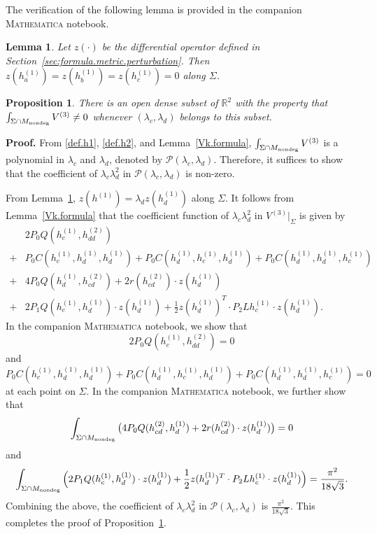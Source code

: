 \documentclass[11pt]{amsart}
\newtheorem{lemma}[theorem]{Lemma}
\newtheorem{proposition}[theorem]{Proposition}
\theoremstyle{definition}
\begin{document}
The verification of the following lemma is provided in the companion \textsc{Mathematica} notebook.

\begin{lemma}\label{za.zb.zc.vanish}
Let $z(\cdot)$ be the differential operator defined in Section~\ref{sec:formula.metric.perturbation}. 
Then $z(h^{(1)}_a)=z(h^{(1)}_b)=z(h^{(1)}_c)=0$ along $\Sigma$.
\end{lemma}


\begin{proposition}
\label{third.order.change.in.sectional.curvature.integral.version}
There is an open dense subset of $\mathbb{R}^2$ with the property that $\int_{\Sigma \cap M_{\text{\rm nondeg}}} V^{(3)} \neq 0$ whenever $(\lambda_c,\lambda_d)$ belongs to this subset. 
\end{proposition}

\textbf{Proof.} 
From \eqref{def.h1}, \eqref{def.h2}, and Lemma~\ref{Vk.formula}, $\int_{\Sigma \cap M_{\text{\rm nondeg}}} V^{(3)}$ is a polynomial in $\lambda_c$ and $\lambda_d$, denoted by $\mathcal{P}(\lambda_c,\lambda_d)$.
Therefore, it suffices to show that the coefficient of $\lambda_c\lambda_d^2$ in $\mathcal{P}(\lambda_c,\lambda_d)$ is non-zero. 

From Lemma~\ref{za.zb.zc.vanish}, $z(h^{(1)})=\lambda_d z(h^{(1)}_d)$ along $\Sigma$.
It follows from Lemma~\ref{Vk.formula} that the coefficient function of $\lambda_c\lambda_d^2$ in $V^{(3)}|_{\Sigma}$ is given by
\begin{align*}
&2 P_0Q(h^{(1)}_c,h^{(2)}_{dd}) \\
+&P_0C( h^{(1)}_c, h^{(1)}_d, h^{(1)}_d )+P_0C( h^{(1)}_d, h^{(1)}_c, h^{(1)}_d )+P_0C( h^{(1)}_d, h^{(1)}_d, h^{(1)}_c )\\
+&4 P_0Q(h^{(1)}_d,h^{(2)}_{cd})+2 r(h^{(2)}_{cd})\cdot z(h^{(1)}_d) \\
+&2 P_1Q(h^{(1)}_c, h^{(1)}_d)\cdot z(h^{(1)}_d)+ \frac{1}{2} z(h^{(1)}_d)^T \cdot P_2 Lh^{(1)}_c \cdot z(h^{(1)}_d).
\end{align*}
In the companion \textsc{Mathematica} notebook, we show that
\[2 P_0Q(h^{(1)}_c,h^{(2)}_{dd})=0\] 
and 
\[P_0C( h^{(1)}_c, h^{(1)}_d, h^{(1)}_d )+P_0C( h^{(1)}_d, h^{(1)}_c, h^{(1)}_d )+P_0C( h^{(1)}_d, h^{(1)}_d, h^{(1)}_c)=0\] 
at each point on $\Sigma$. In the companion \textsc{Mathematica} notebook, we further show that
\[\int_{\Sigma \cap M_{\text{\rm nondeg}}} \big( 4 P_0Q( h^{(2)}_{cd}, h^{(1)}_d )+2 r(h^{(2)}_{cd})\cdot z(h^{(1)}_d) \big)=0\] 
and 
\[\int_{\Sigma \cap M_{\text{\rm nondeg}}} \Big ( 2 P_1Q(h^{(1)}_c, h^{(1)}_d)\cdot z(h^{(1)}_d)+\frac{1}{2} z(h^{(1)}_d)^T \cdot P_2 Lh^{(1)}_c \cdot z(h^{(1)}_d) \Big ) =\frac{\pi^2}{18\sqrt{3}}.\] 
Combining the above, the coefficient of $\lambda_c\lambda_d^2$ in $\mathcal{P}(\lambda_c,\lambda_d)$ is $\frac{\pi^2}{18\sqrt{3}}$. 
This completes the proof of Proposition~\ref{third.order.change.in.sectional.curvature.integral.version}.\\
\end{document}
